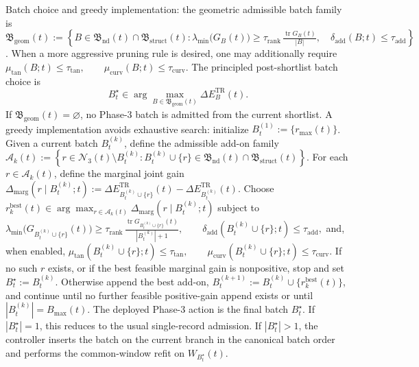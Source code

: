 \documentclass[11pt]{article}
\begin{document}
Batch choice and greedy implementation: the geometric admissible batch family is \(\mathfrak B_{\mathrm{geom}}(t):=\left\{ B\in \mathfrak B_{\mathrm{nd}}(t)\cap \mathfrak B_{\mathrm{struct}}(t): \lambda_{\min}\!\bigl(G_B(t)\bigr) \ge \tau_{\mathrm{rank}}\, \frac{\operatorname{tr}G_B(t)}{|B|}, \quad \delta_{\mathrm{add}}(B;t)\le \tau_{\mathrm{add}} \right\}\). When a more aggressive pruning rule is desired, one may additionally require \(\mu_{\mathrm{tan}}(B;t)\le \tau_{\mathrm{tan}}, \qquad \mu_{\mathrm{curv}}(B;t)\le \tau_{\mathrm{curv}}.\) The principled post-shortlist batch choice is
\[
B_t^\star
\in
\arg\max_{B\in \mathfrak B_{\mathrm{geom}}(t)}
\Delta E_B^{\mathrm{TR}}(t).
\]
If \(\mathfrak B_{\mathrm{geom}}(t)=\varnothing\), no Phase-3 batch is admitted from the current shortlist. A greedy implementation avoids exhaustive search: initialize \(B_t^{(1)}:=\{r_{\max}(t)\}\). Given a current batch \(B_t^{(k)}\), define the admissible add-on family \(\mathcal A_k(t):=\left\{ r\in \mathcal N_3(t)\setminus B_t^{(k)}: B_t^{(k)}\cup\{r\}\in \mathfrak B_{\mathrm{nd}}(t)\cap \mathfrak B_{\mathrm{struct}}(t) \right\}\). For each \(r\in \mathcal A_k(t)\), define the marginal joint gain \(\Delta_{\mathrm{marg}}(r\mid B_t^{(k)};t):=\Delta E_{B_t^{(k)}\cup\{r\}}^{\mathrm{TR}}(t)-\Delta E_{B_t^{(k)}}^{\mathrm{TR}}(t).\) Choose \(r_k^{\mathrm{best}}(t)\in \arg\max_{r\in \mathcal A_k(t)} \Delta_{\mathrm{marg}}(r\mid B_t^{(k)};t)\) subject to \(\lambda_{\min}\!\bigl(G_{B_t^{(k)}\cup\{r\}}(t)\bigr) \ge \tau_{\mathrm{rank}}\, \frac{\operatorname{tr}G_{B_t^{(k)}\cup\{r\}}(t)}{|B_t^{(k)}|+1}, \qquad \delta_{\mathrm{add}}(B_t^{(k)}\cup\{r\};t)\le \tau_{\mathrm{add}},\) and, when enabled, \(\mu_{\mathrm{tan}}(B_t^{(k)}\cup\{r\};t)\le \tau_{\mathrm{tan}}, \qquad \mu_{\mathrm{curv}}(B_t^{(k)}\cup\{r\};t)\le \tau_{\mathrm{curv}}.\) If no such \(r\) exists, or if the best feasible marginal gain is nonpositive, stop and set \(B_t^\star:=B_t^{(k)}\). Otherwise append the best add-on, \(B_t^{(k+1)}:=B_t^{(k)}\cup\{r_k^{\mathrm{best}}(t)\}\), and continue until no further feasible positive-gain append exists or until \(|B_t^{(k)}|=B_{\max}(t)\). The deployed Phase-3 action is the final batch \(B_t^\star\). If \(|B_t^\star|=1\), this reduces to the usual single-record admission. If \(|B_t^\star|>1\), the controller inserts the batch on the current branch in the canonical batch order and performs the common-window refit on \(W_{B_t^\star}(t)\).
\end{document}
